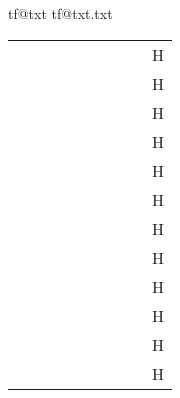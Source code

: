 \documentclass[12pt]{article}
\makeatletter
\def\outputm{
 \begingroup
    \makeatletter
    \if@filesw
      \expandafter\newwrite\csname tf@txt\endcsname
      \immediate\openout \csname tf@txt\endcsname \jobname.txt\relax
    \fi
    \@nobreakfalse
  \endgroup
}
\def\totxt#1{
\immediate\write\tf@txt{%
macro="\noexpand#1"}} \makeatother
\makeatother
\begin{document}
\outputm
\def\arraystretch{1}
\tabcolsep 2pt
\def\tabsep{\makebox{\hskip 18pt}}
\def\K#1{\vbox{\vskip 5mm}#1\totxt{#1}}
\def\Ks#1{\vbox{\vskip 5mm}{\fontencoding{T1}\selectfont#1}\totxt{{\noexpand\fontencoding{T1}\noexpand\selectfont\noexpand#1}}}
\def\vvspace{\mbox{\hskip 10mm \fontsize{20}{22}\selectfont H}}
\def\tabsep{\makebox{\hskip 26pt}}
\begin{tabular}{ccccccccc}
\tabsep & \tabsep & \tabsep& \tabsep & \tabsep & \tabsep & \tabsep & \tabsep  & \vvspace\\
 \K\textbabygamma
&\K\textglotstop
&\K\textrtaill
&\K\textbarb
&\K\texthalflength
&\K\textrtailn
&\K\textbarc
&\K\texthardsign           &\vvspace    \\
 \K\textrtailr
&\K\textbard
&\K\texthooktop
&\K\textrtails
&\K\textbardotlessj
&\K\texthtb
&\K\textrtailt
&\K\textbarg               &\vvspace       \\
 \K\texthtbardotlessj
&\K\textrtailz
&\K\textbarglotstop
&\K\texthtc
&\K\textrthook
&\K\textbari
&\K\texthtd
&\K\textsca                       &\vvspace\\
 \K\textbarl
&\K\texthtg
&\K\textscb
&\K\textbaro
&\K\texthth
&\K\textsce
&\K\textbarrevglotstop
&\K\texththeng                    &\vvspace\\
 \K\textscg
&\K\textbaru
&\K\texthtk
&\K\textsch
&\K\textbeltl
&\K\texthtp
&\K\textschwa
&\K\textbeta                     &\vvspace \\
 \K\texthtq
&\K\textsci
&\K\textbullseye
&\K\texthtscg
&\K\textscj
&\K\textceltpal
&\K\texthtt
&\K\textscl                     &\vvspace  \\
 \K\textchi
&\K\texthvlig
&\K\textscn
&\K\textcloseepsilon
&\K\textinvglotstop
&\K\textscoelig
&\K\textcloseomega
&\K\textinvscr                    &\vvspace\\
 \K\textscomega
&\K\textcloserevepsilon
&\K\textiota
&\K\space
&\K\textcommatailz
&\K\textlambda
&\K\textscr
&\K\textcorner                &\vvspace    \\
 \K\textlengthmark
&\K\textscripta
&\K\textcrb
&\K\textlhookt
&\K\textscriptv
&\K\textscu
&\K\textcrg
&\K\textlhtlongi                 &\vvspace \\
 \K\textscy
&\K\textcrh
&\K\textlonglegr
&\K\textsecstress
&\K\textcrinvglotstop
&\K\textlptr
&\K\textsoftsign
&\K\textcrlambda     &\vvspace             \\
 \K\textltailm
&\K\textstretchc
&\K\textcrtwo
&\K\textltailn
&\K\texttctclig
&\K\textctc
&\K\textltilde
&\K\textteshlig                  &\vvspace \\

\end{tabular}
\end{document}
